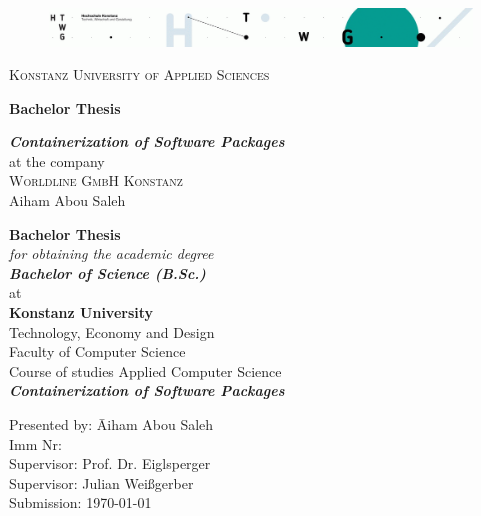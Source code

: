 
\begin{titlepage}
\vspace*{15mm}
\begin{figure}[h]
\centering
\includegraphics[width=\textwidth]{fig/ain}
\label{fig:unilogo}
\end{figure}
{
\center
{\LARGE \textsc{Konstanz University of Applied Sciences}}\\
\vspace*{10mm}

\textbf{{\Large Bachelor Thesis}}\\
\vspace*{40mm}

\textbf{{\Large \textit{Containerization of Software Packages}}}\\ \vspace*{5mm}
{at the company }\\
\vspace*{10mm}
{\Large \textsc{Worldline GmbH Konstanz}}\\
\vspace*{15mm}
{\Large Aiham Abou Saleh}

}


\newpage
\thispagestyle{empty}

{
\center
\vspace*{15mm}
{\Huge \textbf{Bachelor Thesis}}\\ \vspace*{5mm}
\emph{for obtaining the academic degree \\ \vspace*{5mm}
{\LARGE \textbf{Bachelor of Science (B.Sc.)}} }\\
\vspace*{10mm}
{at}\\
\vspace*{10mm}
{\large \textbf{Konstanz University}}\\ \vspace*{5mm}
{Technology, Economy and Design \\ \vspace*{1mm} Faculty of Computer Science  \\ \vspace*{1mm} 
Course of studies Applied Computer Science}\\ \vspace*{10mm}
{\LARGE \textbf{\textit{Containerization of Software Packages }}} 

}
\vspace*{20mm}
\begin{tabbing}
\hspace*{4cm}Presented by: \hspace*{0.5cm}\= Aiham Abou Saleh \\
\hspace*{4cm}Imm Nr:  \\
\hspace*{4cm}Supervisor: \> Prof. Dr. Eiglsperger\\
\hspace*{4cm}Supervisor: \> Julian Weißgerber\\
\hspace*{4cm}Submission: \> \today
\end{tabbing}
\end{titlepage}